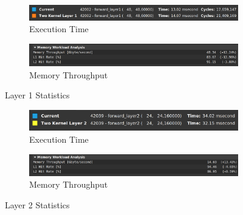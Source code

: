 \documentclass{article}
\begin{document}
\begin{figure}[H]
    \centering
    \begin{subfigure}[b]{\linewidth}
        \includegraphics[width=\linewidth]{shared_layer1_runtime}
        \caption{Execution Time}
    \end{subfigure}
    \begin{subfigure}[b]{\linewidth}
        \includegraphics[width=\linewidth]{shared_layer1_mem}
        \caption{Memory Throughput}
    \end{subfigure}
    \caption{Layer 1 Statistics}
\end{figure}

\begin{figure}[H]
    \centering
    \begin{subfigure}[b]{\linewidth}
        \includegraphics[width=\linewidth]{shared_layer2_runtime}
        \caption{Execution Time}
    \end{subfigure}
    \begin{subfigure}[b]{\linewidth}
        \includegraphics[width=\linewidth]{shared_layer2_mem}
        \caption{Memory Throughput}
    \end{subfigure}
    \caption{Layer 2 Statistics}
\end{figure}
\end{document}
